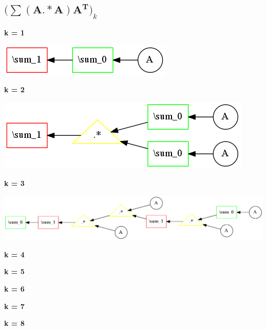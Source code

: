\subsection{$\mathbf{(\sum (A.*A)A^T})_k$}



{\bf k = 1}


\begin{center}
\includegraphics[width=0.45\linewidth]{trees/SumAmultA_1_horizontal_0.png}
\end{center}


{\bf k = 2}


\begin{center}
\includegraphics[width=0.45\linewidth]{trees/SumAmultA_2_horizontal_0.png}
\end{center}


{\bf k = 3}


\begin{center}
\includegraphics[width=0.45\linewidth]{trees/SumAmultA_3_horizontal_0.png}
\end{center}


{\bf k = 4}




{\bf k = 5}




{\bf k = 6}




{\bf k = 7}




{\bf k = 8}




